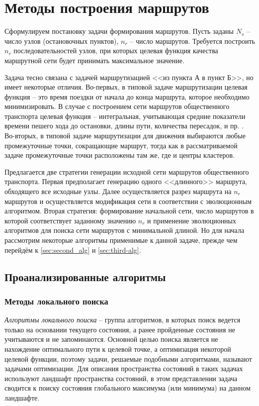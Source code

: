 \chapter{Методы построения маршрутов}
Сформулируем постановку задачи формирования маршрутов. Пусть заданы \( N_s \) – число узлов (остановочных 
пунктов), \( n_r \) – число маршрутов. Требуется построить \( n_r \) последовательностей узлов, при которых 
целевая функция качества маршрутной сети будет принимать максимальное значение. 

Задача тесно связана с задачей маршрутизацией <<из пункта А в пункт Б>>, но имеет некоторые отличия. 
Во-первых, в типовой задаче маршрутизации целевая функция – это время поездки от начала до конца маршрута, 
которое необходимо минимизировать. В случае с построением сети маршрутов общественного транспорта целевая 
функция -- интегральная, учитывающая средние показатели времени пешего хода до остановки, длины пути, 
количества пересадок, и пр. \cite{bib:9,bib:17}. Во-вторых, в типовой задаче маршрутизации для движения 
выбираются любые промежуточные точки, сокращающие маршрут, тогда как в рассматриваемой задаче промежуточные 
точки расположены там же, где и центры кластеров.

Предлагается две стратегии генерации исходной сети маршрутов общественного транспорта. Первая предполагает 
генерацию одного <<длинного>> маршрута, обходящего все исходные узлы. Далее осуществляется разрез маршрута 
на \( n_r \) маршрутов и осуществляется модификация сети в соответствии с эволюционным алгоритмом. Вторая 
стратегия: формирование начальной сети, число маршрутов в которой соответствует заданному значению \( n_r \) 
и применение эволюционных алгоритмов для поиска сети маршрутов с минимальной длиной. Но для начала рассмотрим 
некоторые алгоритмы применимые к данной задаче, прежде чем перейдём к \ref{sec:second_alg} и 
\ref{sec:third-alg}.

\section{Проанализированные алгоритмы}
\subsection{Методы локального поиска}
\emph{Алгоритмы локального поиска} -- группа алгоритмов, в которых поиск ведется только на основании текущего 
состояния, а ранее пройденные состояния не учитываются и не запоминаются. Основной целью поиска является не 
нахождение оптимального пути к целевой точке, а оптимизация некоторой целевой функции, поэтому задачи, 
решаемые подобными алгоритмами, называют задачами оптимизации. Для описания пространства состояний в таких 
задачах используют ландшафт пространства состояний, в этом представлении задача сводится к поиску состояния 
глобального максимума (или минимума) на данном ландшафте.

